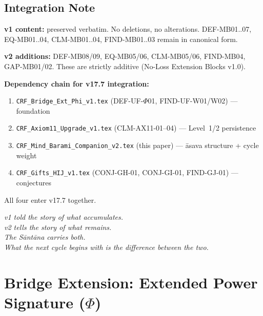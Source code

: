 \documentclass[12pt, a4paper]{article}
\begin{document}
\subsection{Integration Note}


\begin{keybox}[title={v2 Integration into CRF Complete Edition}]
\textbf{v1 content:} preserved verbatim. No deletions,
no alterations. DEF-MB01..07, EQ-MB01..04, CLM-MB01..04,
FIND-MB01..03 remain in canonical form.

\textbf{v2 additions:} DEF-MB08/09, EQ-MB05/06,
CLM-MB05/06, FIND-MB04, GAP-MB01/02. These are
strictly additive (No-Loss Extension Blocks v1.0).

\textbf{Dependency chain for v17.7 integration:}
\begin{enumerate}[leftmargin=*, noitemsep]
\item \texttt{CRF\_Bridge\_Ext\_Phi\_v1.tex}
  (DEF-UF-$\Phi$01, FIND-UF-W01/W02) --- foundation
\item \texttt{CRF\_Axiom11\_Upgrade\_v1.tex}
  (CLM-AX11-01--04) --- Level~1/2 persistence
\item \texttt{CRF\_Mind\_Barami\_Companion\_v2.tex}
  (this paper) --- \={a}sava structure + cycle weight
\item \texttt{CRF\_Gifts\_HIJ\_v1.tex}
  (CONJ-GH-01, CONJ-GI-01, FIND-GJ-01) --- conjectures
\end{enumerate}
All four enter v17.7 together.
\end{keybox}

\bigskip
\begin{center}
\textit{v1 told the story of what accumulates.\\
v2 tells the story of what remains.\\
The S\={a}nt\={a}na carries both.\\
What the next cycle begins with is
the difference between the two.}
\end{center}





\newpage

\section{Bridge Extension: Extended Power Signature ($\Phi$)}
\label{sec:bridge-phi}
\end{document}
